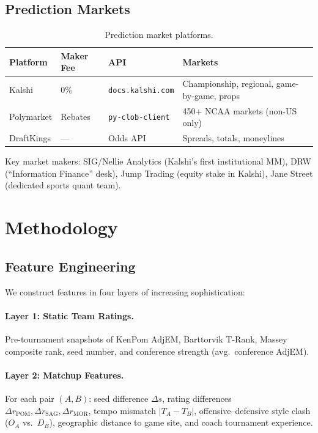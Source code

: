 \documentclass[11pt,a4paper]{article}
\begin{document}
\subsection{Prediction Markets}

\begin{table}[h]
\centering
\caption{Prediction market platforms.}
\label{tab:markets}
\small
\begin{tabular}{@{}lllp{5.5cm}@{}}
\toprule
\textbf{Platform} & \textbf{Maker Fee} & \textbf{API} & \textbf{Markets} \\
\midrule
Kalshi & 0\% & \texttt{docs.kalshi.com} & Championship, regional, game-by-game, props \\
Polymarket & Rebates & \texttt{py-clob-client} & 450+ NCAA markets (non-US only) \\
DraftKings & --- & Odds API & Spreads, totals, moneylines \\
\bottomrule
\end{tabular}
\end{table}

\noindent Key market makers: SIG/Nellie Analytics (Kalshi's first institutional MM), DRW (``Information Finance'' desk), Jump Trading (equity stake in Kalshi), Jane Street (dedicated sports quant team).

\section{Methodology}

\subsection{Feature Engineering}

We construct features in four layers of increasing sophistication:

\paragraph{Layer 1: Static Team Ratings.}
Pre-tournament snapshots of KenPom AdjEM, Barttorvik T-Rank, Massey composite rank, seed number, and conference strength (avg.\ conference AdjEM).

\paragraph{Layer 2: Matchup Features.}
For each pair $(A, B)$: seed difference $\Delta s$, rating differences $\Delta r_{\text{POM}}, \Delta r_{\text{SAG}}, \Delta r_{\text{MOR}}$, tempo mismatch $|T_A - T_B|$, offensive--defensive style clash ($O_A$ vs.\ $D_B$), geographic distance to game site, and coach tournament experience.
\end{document}
